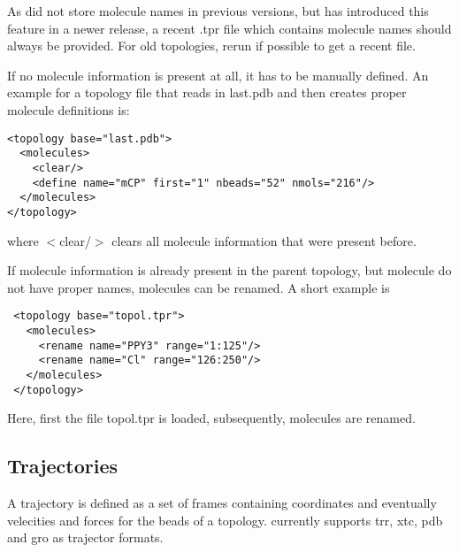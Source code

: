 As \gromacs did not store molecule names in previous versions, but has introduced this feature in a newer release,  a recent .tpr file which contains molecule names should always be provided. For old topologies, rerun \gromacs {} if possible to get a recent file.

If no molecule information is present at all, it has to be manually defined. An example for a topology file that reads in last.pdb and then creates proper molecule definitions is:
\begin{lstlisting}
<topology base="last.pdb">
  <molecules>
    <clear/>
    <define name="mCP" first="1" nbeads="52" nmols="216"/>
  </molecules>
</topology>
\end{lstlisting}
where $<$clear/$>$ clears all molecule information that were present before.

If molecule information is already present in the parent topology, but molecule do not have proper names, molecules can be renamed. A short example is
\begin{lstlisting}
 <topology base="topol.tpr">
   <molecules>
     <rename name="PPY3" range="1:125"/>
     <rename name="Cl" range="126:250"/>
   </molecules>
 </topology>
\end{lstlisting}
Here, first the file topol.tpr is loaded, subsequently, molecules are renamed.

\subsection{Trajectories}
A trajectory is defined as a set of frames containing coordinates and eventually velecities and forces for the beads of a topology.
\votca currently supports trr, xtc, pdb and gro as trajector formats.







